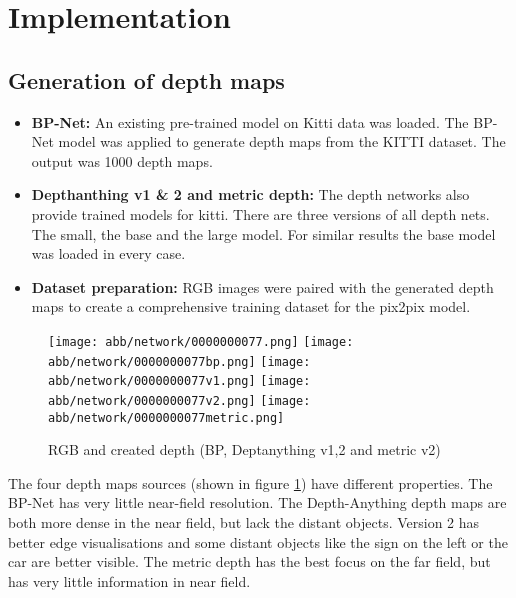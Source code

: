 \section{Implementation}
\subsection{Generation of depth maps}
\begin{itemize}
	\item \textbf{BP-Net:} An existing pre-trained model on Kitti data was loaded. The BP-Net model was applied to generate depth maps from the KITTI dataset. The output was 1000 depth maps.
	
	\item \textbf{Depthanthing v1 \& 2 and metric depth:} The depth networks also provide trained models for kitti. There are three versions of all depth nets. The small, the base and the large model. For similar results the base model was loaded in every case.   
	
	\item \textbf{Dataset preparation:} RGB images were paired with the generated depth maps to create a comprehensive training dataset for the pix2pix model.
	\end{itemize}
\begin{figure}[!ht]
	\centering
	\texttt{[image: abb/network/0000000077.png]}
	\texttt{[image: abb/network/0000000077bp.png]}
	\texttt{[image: abb/network/0000000077v1.png]}
	\texttt{[image: abb/network/0000000077v2.png]}
	\texttt{[image: abb/network/0000000077metric.png]}
	\caption{RGB and created depth (BP, Deptanything v1,2 and metric v2)}
	\label{all_depths}
\end{figure}
The four depth maps sources (shown in figure \ref{all_depths}) have different properties. The BP-Net has very little near-field resolution. The Depth-Anything depth maps are both more dense in the near field, but lack the distant objects. Version 2 has better edge visualisations and some distant objects like the sign on the left or the car are better visible. The metric depth has the best focus on the far field, but has very little  information in near field. 

\newpage
